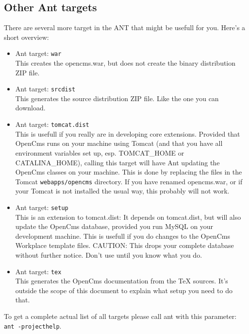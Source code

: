 \subsection{Other Ant targets}

There are several more target in the ANT that might be usefull for you.
Here's a short overview:

\begin{itemize}
\item Ant target: \texttt{war}\\
This creates the opencms.war, but does not create the binary distribution 
ZIP file.

\item Ant target: \texttt{srcdist}\\
This generates the source distribution ZIP file. Like the one you 
can download. 

\item Ant target: \texttt{tomcat.dist}\\
This is usefull if you really are in developing core extensions. Provided
that OpenCms runs on your machine using Tomcat (and that you have all 
environment variables set up, esp. TOMCAT\_HOME or CATALINA\_HOME), calling 
this target will have Ant updating the OpenCms classes on your machine. 
This is done by replacing the files in the Tomcat \texttt{webapps/opencms} directory.
If you have renamed opencms.war, or if your Tomcat is not installed the 
usual way, this probably will not work.

\item Ant target: \texttt{setup}\\
This is an extension to tomcat.dist: It depends on tomcat.dist, but will 
also update the OpenCms database, provided you run MySQL on your development
machine. This is usefull if you do changes to the OpenCms Workplace template
files. CAUTION: This drops your complete database without further notice. 
Don't use until you know what you do. 

\item Ant target: \texttt{tex}\\
This generates the OpenCms documentation from the TeX sources. It's outside 
the scope of this document to explain what setup you need to do that.

\end{itemize}

To get a complete actual list of all targets please call ant with this parameter:\\
\texttt{ant -projecthelp}.

